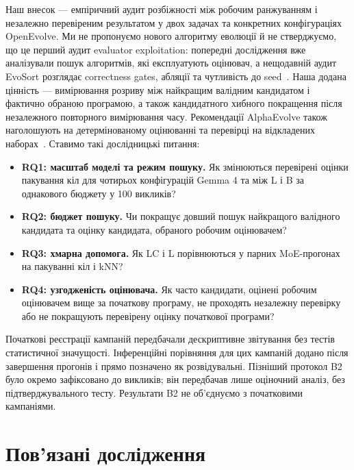 \documentclass[11pt]{article}
\begin{document}
Наш внесок — емпіричний аудит розбіжності між робочим ранжуванням і незалежно перевіреним результатом у двох задачах та конкретних конфігураціях OpenEvolve. Ми не пропонуємо нового алгоритму еволюції й не стверджуємо, що це перший аудит evaluator exploitation: попередні дослідження вже аналізували пошук алгоритмів, які експлуатують оцінювач, а нещодавній аудит EvoSort розглядає correctness gates, абляції та чутливість до seed~\citep{assumpcao2025codeevolve,khudhair2026evosort}. Наша додана цінність — вимірювання розриву між найкращим валідним кандидатом і фактично обраною програмою, а також кандидатного хибного покращення після незалежного повторного вимірювання часу. Рекомендації AlphaEvolve також наголошують на детермінованому оцінюванні та перевірці на відкладених наборах~\citep{googlecloud2026rewardhacking}. Ставимо такі дослідницькі питання:

\begin{itemize}
\item \textbf{RQ1: масштаб моделі та режим пошуку.} Як змінюються перевірені оцінки пакування кіл для чотирьох конфігурацій Gemma 4 та між L і B за однакового бюджету у 100 викликів?
\item \textbf{RQ2: бюджет пошуку.} Чи покращує довший пошук найкращого валідного кандидата та оцінку кандидата, обраного робочим оцінювачем?
\item \textbf{RQ3: хмарна допомога.} Як LC і L порівнюються у парних MoE-прогонах на пакуванні кіл і kNN?
\item \textbf{RQ4: узгодженість оцінювача.} Як часто кандидати, оцінені робочим оцінювачем вище за початкову програму, не проходять незалежну перевірку або не покращують перевірену оцінку початкової програми?
\end{itemize}

Початкові реєстрації кампаній передбачали дескриптивне звітування без тестів статистичної значущості. Інференційні порівняння для цих кампаній додано після завершення прогонів і прямо позначено як розвідувальні. Пізніший протокол B2 було окремо зафіксовано до викликів; він передбачав лише оціночний аналіз, без підтверджувального тесту. Результати B2 не об'єднуємо з початковими кампаніями.

\section{Пов'язані дослідження}\label{sec:related}
\end{document}
